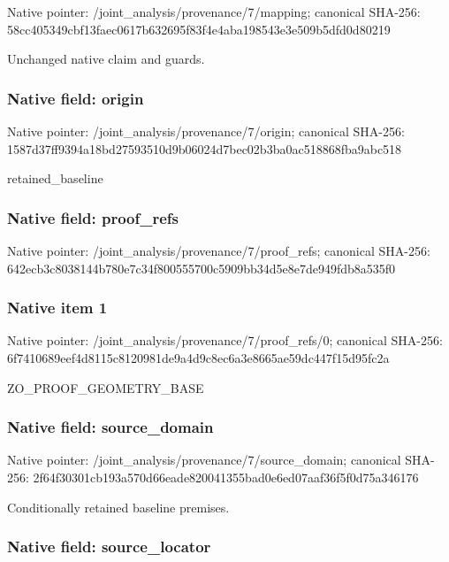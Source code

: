 \documentclass[10pt,a4paper]{article}
\begin{document}
Native pointer: /joint\_analysis/provenance/7/mapping; canonical SHA-256: 58cc405349cbf13faec0617b\allowbreak{}632695f83f4e4aba198543e3\allowbreak{}e509b5dfd0d80219


Unchanged native claim and guards.


\subsubsection{Native field: origin}


Native pointer: /joint\_analysis/provenance/7/origin; canonical SHA-256: 1587d37ff9394a18bd275935\allowbreak{}10d9b06024d7bec02b3ba0ac\allowbreak{}518868fba9abc518


retained\_baseline


\subsubsection{Native field: proof\_refs}


Native pointer: /joint\_analysis/provenance/7/proof\_refs; canonical SHA-256: 642ecb3c8038144b780e7c34\allowbreak{}f800555700c5909bb34d5e8e\allowbreak{}7de949fdb8a535f0



\subsubsection{Native item 1}


Native pointer: /joint\_analysis/provenan\allowbreak{}ce/7/proof\_refs/0; canonical SHA-256: 6f7410689eef4d8115c81209\allowbreak{}81de9a4d9c8ec6a3e8665ae5\allowbreak{}9dc447f15d95fc2a


ZO\_PROOF\_GEOMETRY\_BASE


\subsubsection{Native field: source\_domain}


Native pointer: /joint\_analysis/provenan\allowbreak{}ce/7/source\_domain; canonical SHA-256: 2f64f30301cb193a570d66ea\allowbreak{}de820041355bad0e6ed07aaf\allowbreak{}36f5f0d75a346176


Conditionally retained baseline premises.


\subsubsection{Native field: source\_locator}
\end{document}
